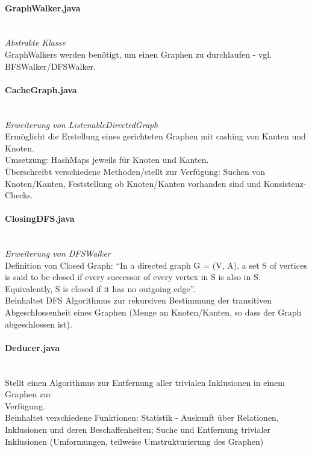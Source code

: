 \documentclass[10pt,a4paper]{article}
\begin{document}
\paragraph{GraphWalker.java}\ \\
\emph{Abstrakte Klasse}\\
GraphWalkers werden benötigt, um einen Graphen zu durchlaufen - vgl. BFSWalker/DFSWalker. \\

\paragraph{CacheGraph.java}\ \\
\emph{Erweiterung von ListenableDirectedGraph}\\
Ermöglicht die Erstellung eines gerichteten Graphen mit cashing von Kanten und Knoten.\\
Umsetzung: HashMaps jeweils für Knoten und Kanten.\\
Überschreibt verschiedene Methoden/stellt zur Verfügung: Suchen von Knoten/Kanten, Feststellung ob Knoten/Kanten vorhanden sind und Konsistenz-Checks.\\

\paragraph{ClosingDFS.java}\ \\
\emph{Erweiterung von DFSWalker}\\
Definition von Closed Graph: "`In a directed graph G = (V, A), a set S of vertices is said to be closed if every successor of every vertex in S is also in S. Equivalently, S is closed if it has no outgoing edge"'.\\
Beinhaltet DFS Algorithmus zur rekursiven Bestimmung der transitiven Abgeschlossenheit eines Graphen (Menge an Knoten/Kanten, so dass der Graph abgeschlossen ist).\\

\paragraph{Deducer.java}\ \\
Stellt einen Algorithmus zur Entfernung aller trivialen Inklusionen in einem Graphen zur \\Verfügung.\\
Beinhaltet verschiedene Funktionen: Statistik - Auskunft über Relationen, Inklusionen und deren Beschaffenheiten; Suche und Entfernung trivialer Inklusionen (Umformungen, teilweise Umstrukturierung des Graphen)\\
\end{document}
